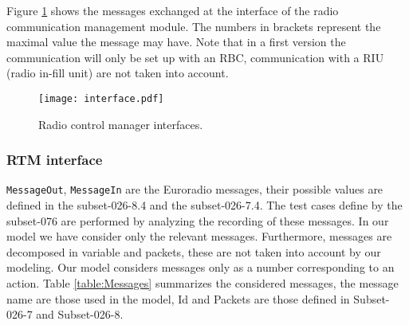 \label{subsec:inputoutput}

Figure \ref{fig:interfaces} shows the messages exchanged at the interface of
the radio communication management module. The numbers in brackets represent the maximal value the message
may have. Note that in a first version the communication will only be set up
with an RBC, communication with a RIU (radio in-fill unit) are not taken
into account.

\begin{figure}[htpb]
\centering
\texttt{[image: interface.pdf]}
\caption{\label{fig:interfaces} Radio control manager interfaces.}
\end{figure}

\subsubsection{RTM interface}
\verb+MessageOut+, \verb+MessageIn+ are the Euroradio messages, their
possible values are defined in the subset-026-8.4 and the subset-026-7.4. The
test cases define by the subset-076 are performed by analyzing the recording of
these messages. In our model we have consider only the relevant messages.
Furthermore, messages are decomposed in variable and packets, these are not
taken into account by our modeling. Our model considers messages only as a number corresponding to an action. 
Table \ref{table:Messages} summarizes the considered messages, the message name
are those used in the model, Id and Packets are those defined in Subset-026-7
and Subset-026-8.

